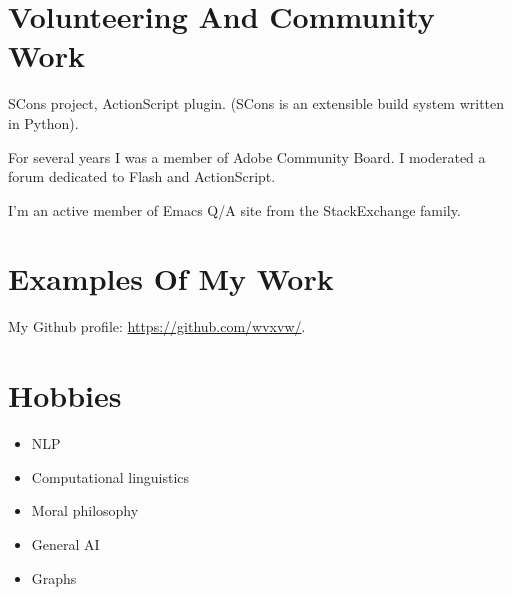 \documentclass[11pt]{article}
\begin{document}
\section{Volunteering And Community Work}
\label{sec:orgheadline14}
SCons project, ActionScript plugin.  (SCons is an extensible build system
written in Python).

For several years I was a member of Adobe Community Board.  I moderated a
forum dedicated to Flash and ActionScript.

I'm an active member of Emacs Q/A site from the StackExchange family.

\section{Examples Of My Work}
\label{sec:orgheadline15}
My Github profile:
\url{https://github.com/wvxvw/}.

\section{Hobbies}
\label{sec:orgheadline16}
\begin{itemize}
\item NLP
\item Computational linguistics
\item Moral philosophy
\item General AI
\item Graphs
\end{itemize}
\end{document}
